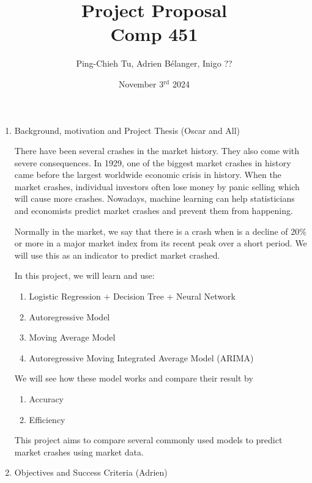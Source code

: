 \documentclass[12pt, letterpaper]{article}
\title{
  Project Proposal \\
  \Large Comp 451}
\author{Ping-Chieh Tu, Adrien Bélanger, Inigo ??}
\date{November 3$^{\text{rd}}$ 2024}
\begin{document}
\maketitle 

\begin{enumerate}
    \item Background, motivation and Project Thesis (Oscar and All)

    There have been several crashes in the market history. They also come with severe consequences. In 1929, one of the biggest market crashes in history came before the largest worldwide economic crisis in history. When the market crashes, individual investors often lose money by panic selling which will cause more crashes. Nowadays, machine learning can help statisticians and economists predict market crashes and prevent them from happening.

    Normally in the market, we say that there is a crash when is a decline of 20$\%$ or more in a major market index from its recent peak over a short period. We will use this as an indicator to predict market crashed.

    In this project, we will learn and use:
    \begin{enumerate}[label=\arabic*.]
      \item Logistic Regression + Decision Tree + Neural Network %
      \item Autoregressive Model
      \item Moving Average Model
      \item Autoregressive Moving Integrated Average Model (ARIMA)
    \end{enumerate}
    We will see how these model works and compare their result by
    \begin{enumerate}[label=\arabic*.]
      \item Accuracy
      \item Efficiency
    \end{enumerate}
    
    This project aims to compare several commonly used models to predict market crashes using market data.
    
    \item Objectives and Success Criteria (Adrien)
    

\end{enumerate}
\end{document}
